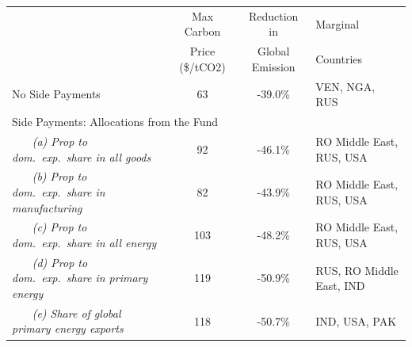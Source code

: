 \begin{center}
\small
\setlength{\tabcolsep}{4pt}
\renewcommand{\arraystretch}{1.25}
\begin{tabular}{l cc l}
\hline
 & Max Carbon & Reduction in  & Marginal \\
 & Price (\$/tCO2) & Global Emission & Countries \\
\hline
 No Side Payments & 63 & -39.0\% & VEN, NGA, RUS \\
\multicolumn{4}{l}{Side Payments: Allocations from the Fund} \\
 ~~~ \textit{(a) Prop to dom.\ exp.\ share in all goods} & 92 & -46.1\% & RO Middle East, RUS, USA \\
 ~~~ \textit{(b) Prop to dom.\ exp.\ share in manufacturing} & 82 & -43.9\% & RO Middle East, RUS, USA \\
 ~~~ \textit{(c) Prop to dom.\ exp.\ share in all energy} & 103 & -48.2\% & RO Middle East, RUS, USA \\
 ~~~ \textit{(d) Prop to dom.\ exp.\ share in primary energy} & 119 & -50.9\% & RUS, RO Middle East, IND \\
 ~~~ \textit{(e) Share of global primary energy exports} & 118 & -50.7\% & IND, USA, PAK \\
\hline
\end{tabular}
\end{center}
